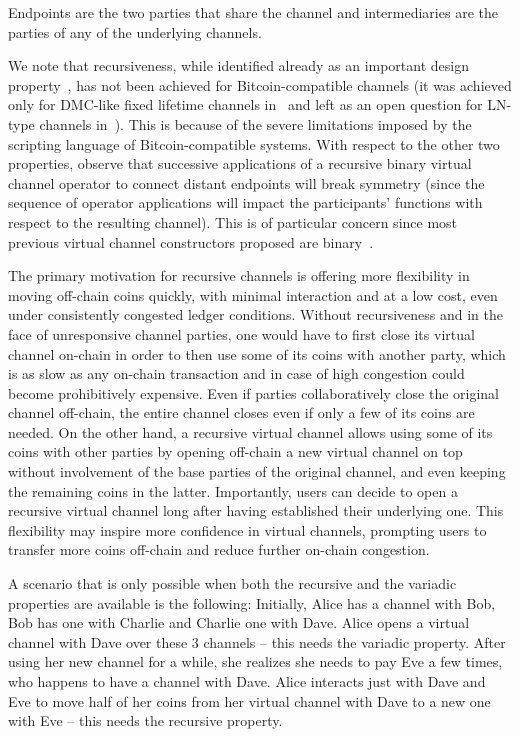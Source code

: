 Endpoints are the two parties that share the channel and intermediaries are
the parties of any of the underlying channels.

We note that recursiveness, while identified already as an important design
property~\cite{DBLP:conf/ccs/DziembowskiFH18}, has not been achieved for Bitcoin-compatible channels
(it was achieved only for DMC-like fixed lifetime channels in~\cite{10.1007/978-3-030-65411-5_18} and left as an open question for LN-type channels in~\cite{9519487}).
This is because of the severe limitations imposed by the scripting language of Bitcoin-compatible systems.
With respect to the other two properties, observe that successive applications
of a recursive binary virtual channel operator to connect distant endpoints will
break symmetry (since the sequence of operator applications will impact the
participants' functions with respect to the resulting channel). This is of
particular concern since most previous virtual channel constructors proposed are
binary~\cite{DBLP:conf/ccs/DziembowskiFH18,9519487,10.1007/978-3-030-65411-5_18}.

The primary motivation for recursive channels is offering more flexibility in
moving off-chain coins quickly, with minimal interaction and at a low cost, even
under consistently
congested ledger conditions. Without recursiveness and in the face of
unresponsive channel parties, one would have to first
close its virtual channel on-chain in order to then use some of its coins with
another party, which is as slow as any on-chain transaction and in case of high
congestion could become prohibitively expensive. Even if parties collaboratively
close the original channel off-chain, the entire
channel closes even if only a few of its coins are needed. On the other hand, a
recursive
virtual channel allows using some of its coins with other parties by
opening off-chain a new virtual channel on top without involvement of the base parties of
the original channel, and even keeping the remaining coins in
the latter. Importantly, users can decide to open a recursive virtual channel
long after having established their underlying one. This flexibility may inspire more confidence in virtual
channels, prompting users to transfer more coins off-chain and
reduce further on-chain congestion.

A scenario that is only possible when both the recursive and the variadic
properties are available is the following: Initially, Alice has a channel with
Bob, Bob has one with Charlie and Charlie one with Dave. Alice opens a virtual
channel with Dave over these $3$ channels -- this needs the variadic property.
After using her new channel for a while, she realizes she needs to pay Eve a few
times, who happens to have a channel with Dave. Alice interacts just with
Dave and Eve to move half of her coins from her virtual channel with Dave to a
new one with Eve -- this needs the recursive property.

